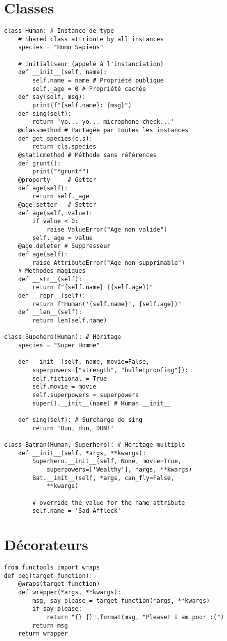 \documentclass{article}
\begin{document}
\begin{multicols*}{4}
\section*{Classes}
\begin{lstlisting}
class Human: # Instance de type
    # Shared class attribute by all instances
    species = "Homo Sapiens"

    # Initialiseur (appelé à l'instanciation)
    def __init__(self, name):
        self.name = name # Propriété publique
        self._age = 0 # Propriété cachée
    def say(self, msg):
        print(f"{self.name}: {msg}")
    def sing(self):
        return 'yo... yo... microphone check...'
    @classmethod # Partagée par toutes les instances
    def get_species(cls):
        return cls.species
    @staticmethod # Méthode sans références
    def grunt():
        print("*grunt*")
    @property     # Getter
    def age(self):
        return self._age
    @age.setter   # Setter
    def age(self, value):
        if value < 0:
            raise ValueError("Age non valide")
        self._age = value
    @age.deleter # Suppresseur
    def age(self):
        raise AttributeError("Age non supprimable")
    # Methodes magiques
    def __str__(self):
        return f"{self.name} ({self.age})"
    def __repr__(self):
        return f"Human('{self.name}', {self.age})"
    def __len__(self):
        return len(self.name)

class Supehero(Human): # Héritage
    species = "Super Homme"

    def __init__(self, name, movie=False,
        superpowers=["strength", "bulletproofing"]):
        self.fictional = True
        self.movie = movie
        self.superpowers = superpowers
        super().__init__(name) # Human __init__

    def sing(self): # Surcharge de sing
        return 'Dun, dun, DUN!'

class Batman(Human, Superhero): # Héritage multiple
    def __init__(self, *args, **kwargs):
        Superhero.__init__(self, None, movie=True,
            superpowers=['Wealthy'], *args, **kwargs)
        Bat.__init__(self, *args, can_fly=False,
            **kwargs)

        # override the value for the name attribute
        self.name = 'Sad Affleck'
\end{lstlisting}

\section*{Décorateurs}
\begin{lstlisting}
from functools import wraps
def beg(target_function):
    @wraps(target_function)
    def wrapper(*args, **kwargs):
        msg, say_please = target_function(*args, **kwargs)
        if say_please:
            return "{} {}".format(msg, "Please! I am poor :(")
        return msg
    return wrapper


\end{lstlisting}
\end{multicols*}
\end{document}
